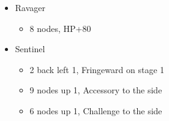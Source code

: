 \begin{paracol}{2}
\begin{menu}
\begin{itemize}
\begin{itemize}
\begin{itemize}
					      \item Ravager
					            \begin{itemize}
						            \item 8 nodes, HP+80
					            \end{itemize}
					      \item Sentinel
					            \begin{itemize}
						            \item 2 back left 1, Fringeward on stage 1
						            \item 9 nodes up 1, Accessory to the side
						            \item 6 nodes up 1, Challenge to the side
					            \end{itemize}
				      \end{itemize}
			\end{itemize}


\end{itemize}
\end{menu}
\end{paracol}
